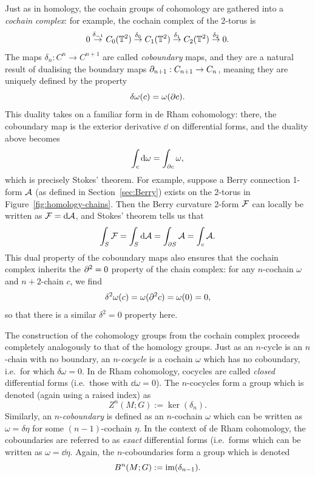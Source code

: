 Just as in homology, the cochain groups of cohomology are gathered into a \emph{cochain complex}: for example, the cochain complex of the 2-torus is
\begin{equation*}
	0 \overset{\delta_{-1}}{\rightarrow} C_0(\mathbb{T}^2) \overset{\delta_0}{\rightarrow} C_1(\mathbb{T}^2) \overset{\delta_1}{\rightarrow} C_2(\mathbb{T}^2) \overset{\delta_2}{\rightarrow} 0.
\end{equation*}
The maps $\delta_n: C^n\to C^{n+1}$ are called \emph{coboundary} maps, and they are a natural result of dualising the boundary maps $\partial_{n+1}: C_{n+1}\to C_n$, meaning they are uniquely defined by the property
\begin{equation}\label{eq:boundary-duality}
	\delta\omega(c) = \omega(\partial c).
\end{equation}
This duality takes on a familiar form in de Rham cohomology: there, the coboundary map is the exterior derivative $\dd$ on differential forms, and the duality above becomes
\begin{equation*}
	\int_{c}\dd{\omega} = \int_{\partial c}\omega,
\end{equation*}
which is precisely Stokes' theorem. For example, suppose a Berry connection 1-form $\mathcal{A}$ (as defined in Section~\ref{sec:Berry}) exists on the 2-torus in Figure~\ref{fig:homology-chains}. Then the Berry curvature 2-form $\mathcal{F}$ can locally be written as $\mathcal{F} = \dd{\mathcal{A}}$, and Stokes' theorem tells us that
\begin{equation*}
	\int_{S}\mathcal{F} = \int_{S}\dd{\mathcal{A}} = \int_{\partial S}\mathcal{A} = \int_c\mathcal{A}.
\end{equation*}
This dual property of the coboundary maps also ensures that the cochain complex inherits the $\partial^2 = 0$ property of the chain complex: for any $n$-cochain $\omega$ and $n+2$-chain $c$, we find
\begin{equation*}
	\delta^2\omega(c) = \omega(\partial^2 c) = \omega(0) = 0,
\end{equation*}
so that there is a similar $\delta^2=0$ property here.

The construction of the cohomology groups from the cochain complex proceeds completely analogously to that of the homology groups. Just as an $n$-cycle is an $n$-chain with no boundary, an $n$-\emph{cocycle} is a cochain $\omega$ which has no coboundary, i.e.\ for which $\delta{\omega} = 0$. In de Rham cohomology, cocycles are called \emph{closed} differential forms (i.e.\ those with $\dd{\omega} = 0$). The $n$-cocycles form a group which is denoted (again using a raised index) as
\begin{equation*}
	Z^n(M;G) := \ker(\delta_n).
\end{equation*}
Similarly, an $n$-\emph{coboundary} is defined as an $n$-cochain $\omega$ which can be written as $\omega=\delta{\eta}$ for some $(n-1)$-cochain $\eta$. In the context of de Rham cohomology, the coboundaries are referred to as \emph{exact} differential forms (i.e.\ forms which can be written as $\omega = \dd\eta$. Again, the $n$-coboundaries form a group which is denoted
\begin{equation*}
	B^n(M;G) := \operatorname{im}(\delta_{n-1}).
\end{equation*}

